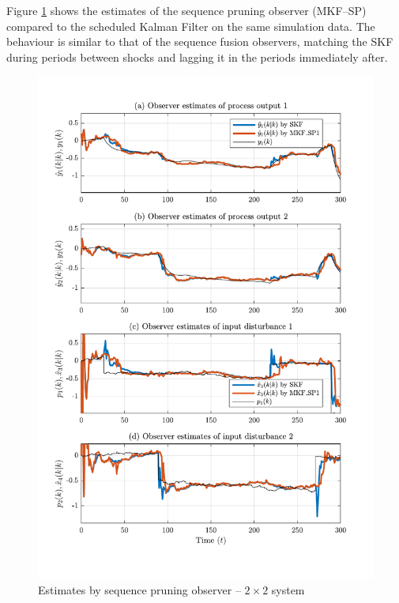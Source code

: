Figure \ref{fig:rod-obs-sim2-yest-1-SP} shows the estimates of the sequence pruning observer (MKF--SP) compared to the scheduled Kalman Filter on the same simulation data. The behaviour is similar to that of the sequence fusion observers, matching the \gls{SKF} during periods between shocks and lagging it in the periods immediately after.
\begin{figure}[htp]
	\centering
	\includegraphics[width=13cm]{images/rod_obs_sim3_all_seed_y_est1_SP1.pdf}
	\caption{Estimates by sequence pruning observer –  $2\times2$ system}
	\label{fig:rod-obs-sim2-yest-1-SP}
\end{figure}

